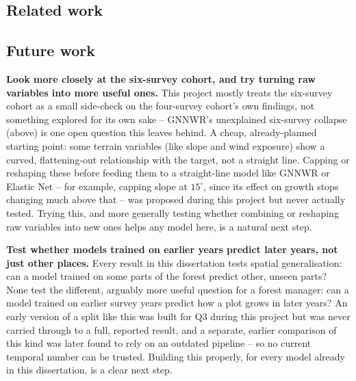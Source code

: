 

\subsection*{Related work}

\subsection*{Future work}
\textbf{Look more closely at the six-survey cohort, and try turning raw variables into more useful ones.} This project mostly treats the six-survey cohort as a small side-check on the four-survey cohort's own findings, not something explored for its own sake -- GNNWR's unexplained six-survey collapse (above) is one open question this leaves behind. A cheap, already-planned starting point: some terrain variables (like slope and wind exposure) show a curved, flattening-out relationship with the target, not a straight line. Capping or reshaping these before feeding them to a straight-line model like GNNWR or Elastic Net -- for example, capping slope at $15^\circ$, since its effect on growth stops changing much above that -- was proposed during this project but never actually tested. Trying this, and more generally testing whether combining or reshaping raw variables into new ones helps any model here, is a natural next step.

\textbf{Test whether models trained on earlier years predict later years, not just other places.} Every result in this dissertation tests spatial generalisation: can a model trained on some parts of the forest predict other, unseen parts? None test the different, arguably more useful question for a forest manager: can a model trained on earlier survey years predict how a plot grows in later years? An early version of a split like this was built for Q3 during this project but was never carried through to a full, reported result, and a separate, earlier comparison of this kind was later found to rely on an outdated pipeline -- so no current temporal number can be trusted. Building this properly, for every model already in this dissertation, is a clear next step.

